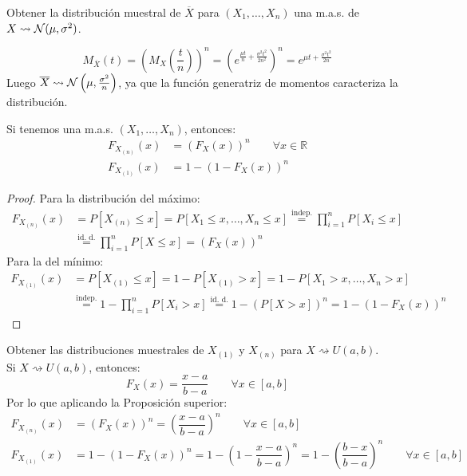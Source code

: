 \begin{ejercicio}\label{ej:dist_muestral_media}
    Obtener la distribución muestral de $\overline{X}$ para $(X_1, \ldots, X_n)$ una m.a.s. de $X\rightsquigarrow \mathcal{N}(\mu, \sigma^2)$.

    \begin{equation*}
        M_{\overline{X}}(t) = {\left(M_X\left(\frac{t}{n}\right)\right)}^{n} = {\left(e^{\frac{\mu t}{n} + \frac{\sigma^2 t^2}{2n^2}}\right)}^{n} = e^{\mu t + \frac{\sigma^2 t^2}{2n}}
    \end{equation*}
    Luego $\overline{X}\rightsquigarrow \mathcal{N}\left(\mu, \frac{\sigma^2}{n}\right)$, ya que la función generatriz de momentos caracteriza la distribución.
\end{ejercicio}

\begin{prop}
    Si tenemos una m.a.s. $(X_1, \ldots, X_n)$, entonces:
    \begin{align*}
        F_{X_{(n)}}(x) &= {(F_X(x))}^{n} \qquad \forall x\in \mathbb{R} \\
        F_{X_{(1)}}(x) &= 1-{(1-F_X(x))}^{n}
    \end{align*}
    \begin{proof}
        Para la distribución del máximo:
        \begin{align*}
            F_{X_{(n)}}(x) &= P[X_{(n)} \leq x] = P[X_1 \leq x, \ldots, X_n \leq x] \stackrel{\text{indep.}}{=} \prod_{i=1}^{n} P[X_i \leq x] \\ &\stackrel{\text{id. d.}}{=} \prod_{i=1}^{n} P[X\leq x] = {(F_X(x))}^{n}
        \end{align*}
        Para la del mínimo:
        \begin{align*}
            F_{X_{(1)}}(x) &= P[X_{(1)}\leq x] = 1-P[X_{(1)} > x] = 1-P[X_1 > x, \ldots, X_n > x] \\ &\stackrel{\text{indep.}}{=} 1 - \prod_{i=1}^{n}P[X_i > x] \stackrel{\text{id. d.}}{=} 1-{(P[X>x])}^{n} = 1-{(1-F_X(x))}^{n}
        \end{align*}
    \end{proof}
\end{prop}

\begin{ejercicio}
    Obtener las distribuciones muestrales de $X_{(1)}$ y  $X_{(n)}$ para \newline $X\rightsquigarrow U(a,b)$.\\

    \noindent
    Si $X\rightsquigarrow U(a,b)$, entonces:
    \begin{equation*}
        F_X(x) = \dfrac{x-a}{b-a} \qquad \forall x\in [a,b]
    \end{equation*}
    Por lo que aplicando la Proposición superior:
    \begin{align*}
        F_{X_{(n)}}(x) &= {(F_X(x))}^{n} = {\left(\dfrac{x-a}{b-a}\right)}^{n} \qquad \forall x\in [a,b] \\
        F_{X_{(1)}}(x) &= 1 - {(1-F_X(x))}^{n} = 1-{\left(1-\dfrac{x-a}{b-a}\right)}^{n} 
        = 1-{\left(\dfrac{b-x}{b-a}\right)}^{n} \qquad \forall x\in [a,b]
    \end{align*}
\end{ejercicio}

